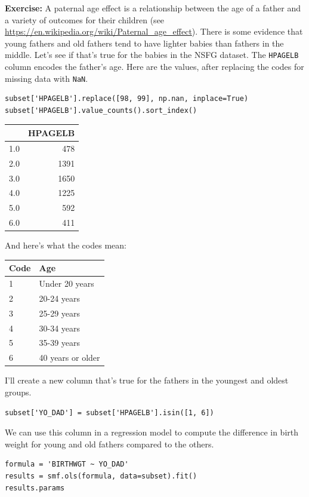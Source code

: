 \textbf{Exercise:} A paternal age effect is a relationship between the
age of a father and a variety of outcomes for their children (see
\url{https://en.wikipedia.org/wiki/Paternal_age_effect}). There is some
evidence that young fathers and old fathers tend to have lighter babies
than fathers in the middle. Let's see if that's true for the babies in
the NSFG dataset. The \passthrough{\lstinline!HPAGELB!} column encodes
the father's age. Here are the values, after replacing the codes for
missing data with \passthrough{\lstinline!NaN!}.

\begin{lstlisting}[]
subset['HPAGELB'].replace([98, 99], np.nan, inplace=True)
subset['HPAGELB'].value_counts().sort_index()
\end{lstlisting}

\begin{tabular}{lr}
\midrule
{} &  HPAGELB \\
\midrule
1.0 &      478 \\
2.0 &     1391 \\
3.0 &     1650 \\
4.0 &     1225 \\
5.0 &      592 \\
6.0 &      411 \\
\midrule
\end{tabular}

And here's what the codes mean:

\begin{longtable}[]{@{}ll@{}}
\midrule
Code & Age\tabularnewline
\midrule
\endhead
1 & Under 20 years\tabularnewline
2 & 20-24 years\tabularnewline
3 & 25-29 years\tabularnewline
4 & 30-34 years\tabularnewline
5 & 35-39 years\tabularnewline
6 & 40 years or older\tabularnewline
\midrule
\end{longtable}

I'll create a new column that's true for the fathers in the youngest and
oldest groups.

\begin{lstlisting}[]
subset['YO_DAD'] = subset['HPAGELB'].isin([1, 6])
\end{lstlisting}

We can use this column in a regression model to compute the difference
in birth weight for young and old fathers compared to the others.

\begin{lstlisting}[]
formula = 'BIRTHWGT ~ YO_DAD'
results = smf.ols(formula, data=subset).fit()
results.params
\end{lstlisting}

